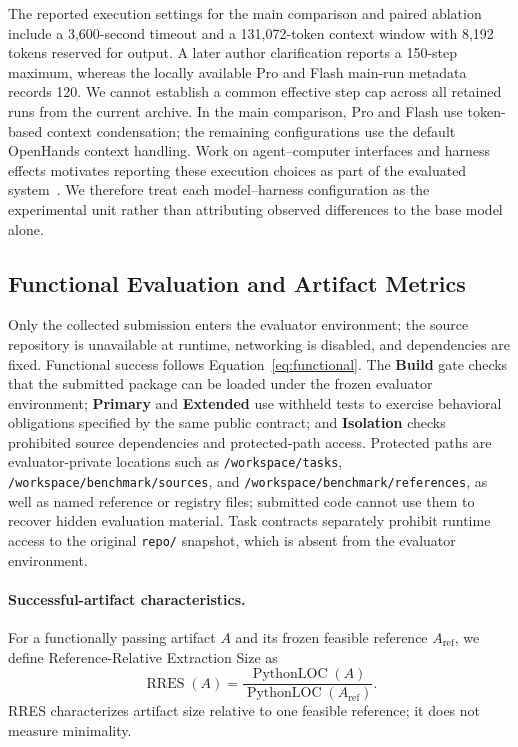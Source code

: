 \documentclass[acmsmall,screen,review,anonymous]{acmart}
\begin{document}
The reported execution settings for the main comparison and paired ablation
include a 3,600-second timeout and a 131,072-token context window with 8,192
tokens reserved for output. A later author clarification reports a 150-step
maximum, whereas the locally available Pro and Flash main-run metadata records
120. We cannot establish a common effective step cap across all retained runs
from the current archive. In the main comparison, Pro and Flash use
token-based context condensation; the remaining configurations use the default
OpenHands context handling. Work on agent--computer interfaces and harness
effects motivates reporting these execution choices as part of the evaluated
system~\cite{yang2024sweagent,yao2026harnessbench}. We therefore treat each
model--harness configuration as the experimental unit rather than attributing
observed differences to the base model alone.

\subsection{Functional Evaluation and Artifact Metrics}

Only the collected submission enters the evaluator environment; the source
repository is unavailable at runtime, networking is disabled, and dependencies
are fixed. Functional success follows Equation~\ref{eq:functional}. The
\textbf{Build} gate checks that the submitted package can be loaded under the
frozen evaluator environment; \textbf{Primary} and \textbf{Extended} use withheld
tests to exercise behavioral obligations specified by the same public contract; and
\textbf{Isolation} checks prohibited source dependencies and protected-path
access. Protected paths are evaluator-private locations such as
\texttt{/workspace/tasks}, \texttt{/workspace/benchmark/sources}, and
\texttt{/workspace/benchmark/references}, as well as named reference or registry
files; submitted code cannot use them to recover hidden evaluation material.
Task contracts separately prohibit runtime access to the original
\texttt{repo/} snapshot, which is absent from the evaluator environment.

\paragraph{Successful-artifact characteristics.}
For a functionally passing artifact $A$ and its frozen feasible reference
$A_{\mathrm{ref}}$, we define Reference-Relative Extraction Size as
\begin{equation}
  \operatorname{RRES}(A)=
  \frac{\operatorname{PythonLOC}(A)}
       {\operatorname{PythonLOC}(A_{\mathrm{ref}})}.
  \label{eq:rres}
\end{equation}
RRES characterizes artifact size relative to one feasible reference; it does
not measure minimality.
\end{document}
